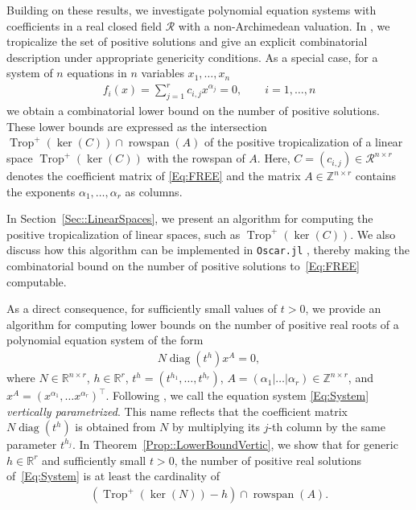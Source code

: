 \documentclass{article}
\theoremstyle{definition}
\DeclareMathOperator{\Trop}{Trop}
\DeclareMathOperator{\rowspan}{rowspan}
\DeclareMathOperator{\diag}{diag}
\begin{document}
 
Building on these results, we investigate polynomial equation systems with coefficients in a real closed field $\mathcal{R}$ with a non-Archimedean valuation.
In , we tropicalize the set of positive solutions and give an explicit combinatorial description under appropriate genericity conditions.
As a special case, for a system of $n$ equations in $n$ variables $x_1, \dots ,x_n$
\begin{align}
\label{Eq:FREE}
 f_i(x) = \sum_{j=1}^r c_{i,j} x^{\alpha_j} = 0, \qquad i = 1, \dots, n
\end{align}
we obtain a combinatorial lower bound on the number of positive solutions.
These lower bounds are expressed as the intersection $\Trop^+(\ker(C)) \cap \rowspan(A)$ of the positive tropicalization of a linear space $\Trop^+(\ker(C))$ with the rowspan of $A$.
Here,  $C = (c_{i,j}) \in \mathcal{R}^{n \times r}$ denotes the coefficient matrix of \eqref{Eq:FREE} and the matrix $A \in \mathbb{Z}^{n \times r}$ contains the exponents $\alpha_1, \dots , \alpha_r$ as columns.

In Section~\ref{Sec::LinearSpaces}, we present an algorithm for computing the positive tropicalization of linear spaces, such as $\Trop^+(\ker(C))$. We also discuss how this algorithm can be implemented in \texttt{Oscar.jl} \cite{OSCARbook}, thereby making the combinatorial bound on the number of positive solutions to~\eqref{Eq:FREE} computable.




As a direct consequence, for sufficiently small values of $t> 0$, we provide an algorithm for computing lower bounds on the number of positive real roots of a polynomial equation system of the form
\begin{align}
\label{Eq:System}
 N \diag(t^h) x^A = 0,
\end{align}
 where $N  \in \mathbb{R}^{n\times r}$, $h \in \mathbb{R}^r$, $t^h = (t^{h_1},\dots,t^{h_r})$, $A = (\alpha_1 | \dots| \alpha_r)  \in \mathbb{Z}^{n \times r}$, and $x^A = (x^{\alpha_1}, \dots x^{\alpha_r})^\top$. Following \cite{RenHelminck,FeliuDim}, we call the equation system \eqref{Eq:System} \emph{vertically parametrized}.
This name reflects that the coefficient matrix $N \diag(t^h)$ is obtained from $N$ by multiplying its $j$-th column by the same parameter $t^{h_j}$. In Theorem~\ref{Prop::LowerBoundVertic}, we show that for generic $h \in \mathbb{R}^r$ and sufficiently small $t > 0$, the number of positive real solutions of~\eqref{Eq:System}  is at least the cardinality of
\begin{align}
\label{Eq:PosTropInt}
 (\Trop^+(\ker(N))-h) \cap \rowspan(A).
\end{align}
\end{document}
